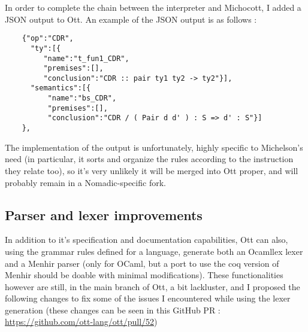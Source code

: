 \documentclass{report}
\begin{document}
In order to complete the chain between the interpreter and Michocott, I added a JSON output to Ott. An example of the JSON output is as follows :
\begin{lstlisting}
    {"op":"CDR",
      "ty":[{
         "name":"t_fun1_CDR",
         "premises":[],
         "conclusion":"CDR :: pair ty1 ty2 -> ty2"}],
      "semantics":[{
          "name":"bs_CDR",
          "premises":[],
          "conclusion":"CDR / ( Pair d d' ) : S => d' : S"}]
    },
\end{lstlisting}
The implementation of the output is unfortunately, highly specific to Michelson's need (in particular, it sorts and organize the rules according to the instruction they relate too), so it's very unlikely it will be merged into Ott proper, and will probably remain in a Nomadic-specific fork.

\subsection{Parser and lexer improvements}

In addition to it's specification and documentation capabilities, Ott can also, using the grammar rules defined for a language, generate both an Ocamllex lexer and a Menhir parser (only for OCaml, but a port to use the coq version of Menhir should be doable with minimal modifications). These functionalities however are still, in the main branch of Ott, a bit lackluster, and I proposed the following changes to fix some of the issues I encountered while using the lexer generation (these changes can be seen in this GitHub PR : \url{https://github.com/ott-lang/ott/pull/52})
\end{document}
